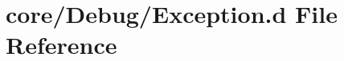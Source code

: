\hypertarget{_exception_8d}{\section{core/\+Debug/\+Exception.d File Reference}
\label{_exception_8d}
}
